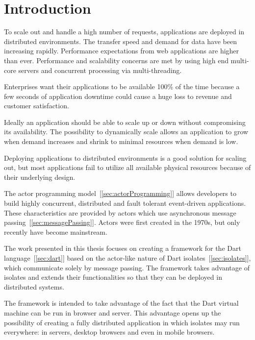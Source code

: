 \chapter{Introduction}\label{chapter:introduction}
  To scale out and handle a high number of requests, applications are deployed in distributed environments. The transfer speed and demand for data have been increasing rapidly. Performance expectations from web applications are higher than ever.
Performance and scalability concerns are met by using high end multi-core servers and concurrent processing via multi-threading.

  Enterprises want their applications to be available 100\% of the time because a few seconds of application downtime could cause a huge loss to revenue and customer satisfaction.

  Ideally an application should be able to scale up or down without compromising its availability. The possibility to dynamically scale allows an application to grow when demand increases and shrink to minimal resources when demand is low.

  Deploying applications to distributed environments is a good solution for scaling out, but most applications fail to utilize all available physical resources because of their underlying design.

  The actor programming model~[\autoref{sec:actorProgramming}] allows developers to build highly concurrent, distributed and fault tolerant event-driven applications. These characteristics are provided by actors which use asynchronous message passing~[\autoref{sec:messagePassing}]. Actors were first created in the 1970s, but only recently have become mainstream.

  The work presented in this thesis focuses on creating a framework for the Dart language~[\autoref{sec:dart}] based on the actor-like nature of Dart isolates~[\autoref{sec:isolates}], which communicate solely by message passing. The framework takes advantage of isolates and extends their functionalities so that they can be deployed in distributed systems.

  The framework is intended to take advantage of the fact that the Dart virtual machine can be run in browser and server. This advantage opens up the possibility of creating a fully distributed application in which isolates may run everywhere: in servers, desktop browsers and even in mobile browsers.

